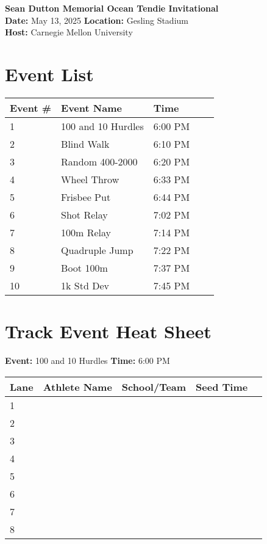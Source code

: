 \documentclass[11pt]{article}
\begin{document}
\begin{center}
    \LARGE \textbf{Sean Dutton Memorial Ocean Tendie Invitational} \\
    \large
    \vspace{0.5em}
    \textbf{Date:} May 13, 2025 \hspace{2cm} \textbf{Location:} Gesling Stadium \\
    \textbf{Host:} Carnegie Mellon University
\end{center}

\vspace{1em}

\section*{Event List}

\begin{tabular}{@{}lllll@{}}
\toprule
\textbf{Event \#} & \textbf{Event Name} &  \textbf{Time} \\
\midrule
1 & 100 and 10 Hurdles & 6:00 PM \\
2 & Blind Walk & 6:10 PM \\
3 & Random 400-2000 & 6:20 PM \\
4 & Wheel Throw & 6:33 PM \\
5 & Frisbee Put & 6:44 PM \\
6 & Shot Relay & 7:02 PM \\
7 & 100m Relay & 7:14 PM \\
8 & Quadruple Jump & 7:22 PM \\
9 & Boot 100m & 7:37 PM \\
10 & 1k Std Dev & 7:45 PM \\
\bottomrule
\end{tabular}



\vspace{2em}

\section*{Track Event Heat Sheet}


\textbf{Event:} 100 and 10 Hurdles \quad \textbf{Time:} 6:00 PM 

\vspace{1em}
\begin{tabular}{@{}lllll@{}}
\toprule
\textbf{Lane} & \textbf{Athlete Name} & \textbf{School/Team} & \textbf{Seed Time} \\
\midrule
1 & & & \\
2 & & & \\
3 & & & \\
4 & & & \\
5 & & & \\
6 & & & \\
7 & & & \\
8 & & & \\
\bottomrule
\end{tabular}
\vspace{2.5em}
\end{document}
